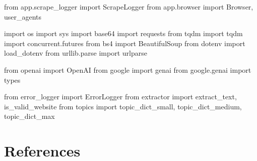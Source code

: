 \documentclass[
  titlepage]{article}
\begin{document}
from app.scrape\_logger import ScrapeLogger from app.browser import
Browser, user\_agents

import os import sys import base64 import requests from tqdm import tqdm
import concurrent.futures from bs4 import BeautifulSoup from dotenv
import load\_dotenv from urllib.parse import urlparse

from openai import OpenAI from google import genai from google.genai
import types

from error\_logger import ErrorLogger from extractor import
extract\_text, is\_valid\_website from topics import topic\_dict\_small,
topic\_dict\_medium, topic\_dict\_max

\section*{References}\label{references}
\end{document}
